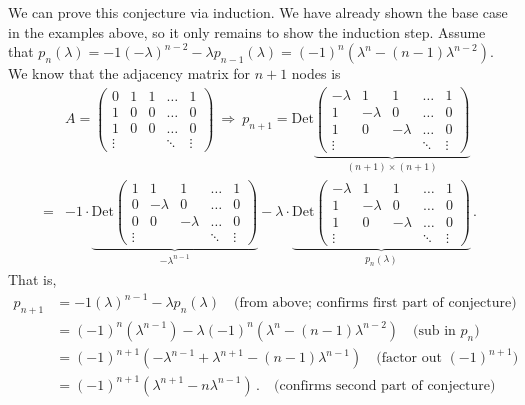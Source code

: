 \documentclass[11pt]{article}
\begin{document}
We can prove this conjecture via induction. We have already shown the base case in the examples above, so it only remains to show the induction step. Assume that $p_n(\lambda) = -1(-\lambda)^{n-2} -\lambda p_{n-1}(\lambda) = (-1)^n \left(\lambda^{n} - (n-1)\lambda^{n-2}\right)$. We know that the adjacency matrix for $n+1$ nodes is
\begin{align*} &A = \begin{pmatrix} 0 & 1 & 1 & \dots & 1 \\ 1 & 0 & 0 & \dots & 0 \\ 1 & 0 & 0 & \dots & 0 \\ \vdots & & & \ddots & \vdots  \end{pmatrix}  \
 \Rightarrow \ p_{n+1} = \mathrm{Det}\underbrace{\begin{pmatrix} -\lambda & 1 & 1 & \dots & 1 \\ 1 & -\lambda & 0 & \dots & 0 \\ 1 & 0 & -\lambda & \dots & 0 \\ \vdots & & & \ddots & \vdots  \end{pmatrix}}_{(n+1)\times(n+1)} \\ = 
 &-1\cdot \underbrace{\mathrm{Det}\begin{pmatrix} 1 & 1 & 1 & \dots & 1 \\ 0 & -\lambda & 0 & \dots & 0 \\ 0 & 0 & -\lambda & \dots & 0 \\ \vdots & & & \ddots & \vdots  \end{pmatrix}}_{-\lambda^{n-1}}
  - \lambda \cdot \underbrace{\mathrm{Det} \begin{pmatrix} -\lambda & 1 & 1 & \dots & 1 \\ 1 & -\lambda & 0 & \dots & 0 \\ 1 & 0 & -\lambda & \dots & 0 \\ \vdots & & & \ddots & \vdots  \end{pmatrix}}_{p_n(\lambda)}\,.
 \end{align*}
 That is, 
 \begin{align*}
 	p_{n+1} &= -1(\lambda)^{n-1}-\lambda p_n(\lambda) \quad \text{(from above; confirms first part of conjecture)} \\
			&= (-1)^n\left(\lambda^{n-1}\right) - \lambda (-1)^n \left(\lambda^{n} - (n-1)\lambda^{n-2}\right) \quad \text{(sub in $p_n$)} \\
			&=(-1)^{n+1} \left( -\lambda^{n-1} + \lambda^{n+1} - (n-1)\lambda^{n-1}\right) \quad \text{(factor out $(-1)^{n+1}$)} \\
			& = (-1)^{n+1} \left(\lambda^{n+1} - n\lambda^{n-1}\right) \,. \quad \text{(confirms second part of conjecture)}
 \end{align*}
\end{document}
